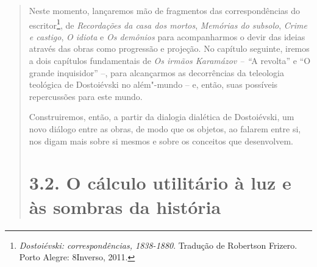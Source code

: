 {\begin{quote}
Neste momento, lançaremos mão de fragmentos das correspondências do
escritor\footnote{\emph{Dostoiévski: correspondências, 1838-1880}.
  Tradução de Robertson Frizero. Porto Alegre: 8Inverso, 2011.}, de
\emph{Recordações da casa dos mortos}, \emph{Memórias do subsolo},
\emph{Crime e castigo}, \emph{O idiota} e \emph{Os demônios} para
acompanharmos o devir das ideias através das obras como progressão e
projeção. No capítulo seguinte, iremos a dois capítulos fundamentais de
\emph{Os irmãos Karamázov -- ``}A revolta'' e ``O grande inquisidor''
--, para alcançarmos as decorrências da teleologia teológica de
Dostoiévski no além"-mundo -- e, então, suas possíveis repercussões para
este mundo.

Construiremos, então, a partir da dialogia dialética de Dostoiévski, um
novo diálogo entre as obras, de modo que os objetos, ao falarem entre
si, nos digam mais sobre si mesmos e sobre os conceitos que desenvolvem.

\section{3.2. O cálculo utilitário à luz e às sombras da história}


\end{quote}}
